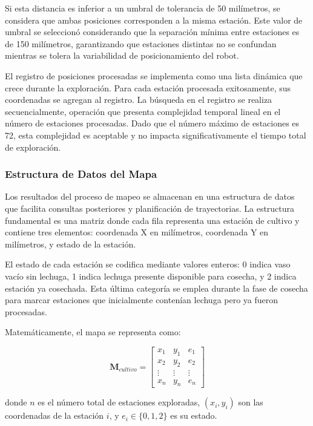 Si esta distancia es inferior a un umbral de tolerancia de 50 milímetros, se considera que ambas posiciones corresponden a la misma estación. Este valor de umbral se seleccionó considerando que la separación mínima entre estaciones es de 150 milímetros, garantizando que estaciones distintas no se confundan mientras se tolera la variabilidad de posicionamiento del robot.

El registro de posiciones procesadas se implementa como una lista dinámica que crece durante la exploración. Para cada estación procesada exitosamente, sus coordenadas se agregan al registro. La búsqueda en el registro se realiza secuencialmente, operación que presenta complejidad temporal lineal en el número de estaciones procesadas. Dado que el número máximo de estaciones es 72, esta complejidad es aceptable y no impacta significativamente el tiempo total de exploración.

\subsubsection{Estructura de Datos del Mapa}

Los resultados del proceso de mapeo se almacenan en una estructura de datos que facilita consultas posteriores y planificación de trayectorias. La estructura fundamental es una matriz donde cada fila representa una estación de cultivo y contiene tres elementos: coordenada X en milímetros, coordenada Y en milímetros, y estado de la estación.

El estado de cada estación se codifica mediante valores enteros: 0 indica vaso vacío sin lechuga, 1 indica lechuga presente disponible para cosecha, y 2 indica estación ya cosechada. Esta última categoría se emplea durante la fase de cosecha para marcar estaciones que inicialmente contenían lechuga pero ya fueron procesadas.

Matemáticamente, el mapa se representa como:

\begin{equation}
\mathbf{M}_{cultivo} = \begin{bmatrix}
x_1 & y_1 & e_1 \\
x_2 & y_2 & e_2 \\
\vdots & \vdots & \vdots \\
x_n & y_n & e_n
\end{bmatrix}
\end{equation}

donde $n$ es el número total de estaciones exploradas, $(x_i, y_i)$ son las coordenadas de la estación $i$, y $e_i \in \{0, 1, 2\}$ es su estado.

